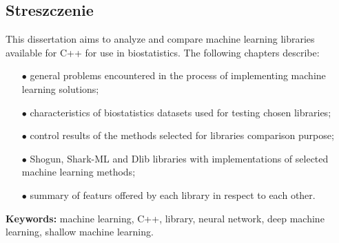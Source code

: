 
\subsection*{Streszczenie}

	This dissertation aims to analyze and compare machine learning libraries available for C++ for use in biostatistics. The following chapters describe:

    \begin{itemize}
    	\item [$\bullet$] general problems encountered in the process of implementing machine learning solutions;
    	\item [$\bullet$] characteristics of biostatistics datasets used for testing chosen libraries;
    	\item [$\bullet$] control results of the methods selected for libraries comparison purpose;
    	\item [$\bullet$] Shogun, Shark-ML and Dlib libraries with implementations of selected machine learning methods;
    	\item [$\bullet$] summary of featurs offered by each library in respect to each other.
    \end{itemize}

\vspace{1cm}
\noindent\textbf{Keywords:} machine learning, C++, library, neural network, deep machine learning, shallow machine learning.
